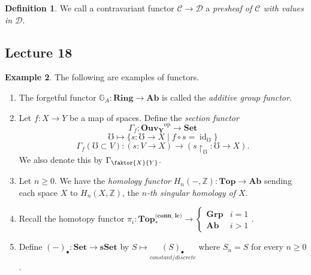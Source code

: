 \documentclass[10pt,letterpaper,cm]{nupset}
\theoremstyle{definition}
\newtheorem{definition}{Definition}[subsection]
\newtheorem{exmp}[definition]{Example}
\theoremstyle{theorem}
\theoremstyle{remark}
\newcommand{\G}{\mathbb G}
\newcommand{\Z}{\mathbb Z}
\newcommand{\1}{\mathbf{1}}
\renewcommand{\c}{\mathscr{C}}
\renewcommand{\d}{\mathscr{D}}
\newcommand{\0}{\vec 0}
\DeclareMathOperator{\id}{id}
\DeclareMathOperator{\op}{op}
\begin{document}
\begin{definition}
We call a contravariant functor $\c \to \d$ a \textit{presheaf of $\c$ with values in $\d$}.
\end{definition}

\subsection{Lecture 18}

\begin{exmp}  The following are examples of functors.
\begin{enumerate}
\item The forgetful functor $\G_A: \mathbf{Ring} \to \mathbf{Ab}$ is called the \textit{additive group functor}.
\item Let $f: X \to Y$ be a map of spaces. Define the \textit{section functor}
 $$\Gamma_f: \mathbf{Ouv_Y}^{\op} \to \mathbf{Set}$$
$$\mho \mapsto \{s: \mho \to X \mid f \circ s = \id_{\mho}\}$$
$$\Gamma_f(\mho \subset V) : (s: V \to X) \to (s\restriction_{\mho} : \mho \to X).$$ We also denote this by $\Gamma_{\faktor{X}{Y}}$.
\item Let $n\geq 0$. We have the \textit{homology functor} $H_n(-, \Z) : \mathbf{Top} \to \mathbf{Ab}$ sending each space $X$ to $H_n(X, \Z)$, the \textit{$n$-th singular homology of $X$}.
\item Recall the homotopy functor $\pi_i : \mathbf{Top_{\ast}^{\text{(conn, lc)}}} \to
 \begin{cases} 
\mathbf{Grp} & i = 1 \\
\mathbf{Ab} & i >1
\end{cases}.$
\item Define $(-)_{\bullet} : \mathbf{Set} \to {\mathbf{sSet}}$ by $S \mapsto \underset{\textit{constant/discrete}}{(S)_{\bullet}}$ where $S_n =S$ for every $n\geq 0$.


\end{enumerate}
\end{exmp}
\end{document}
